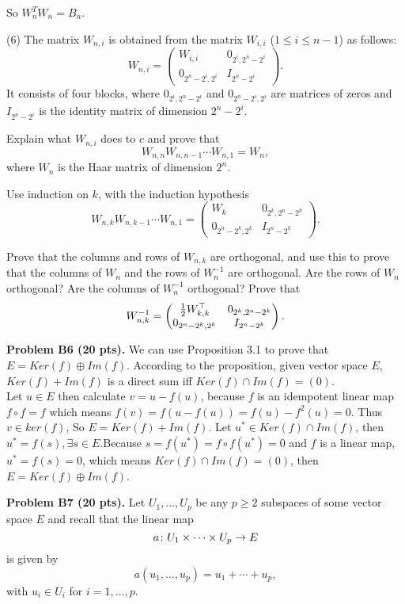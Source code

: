 \documentclass[12pt]{article}
\begin{document}
So $W_n^TW_n = B_n$.




\medskip
(6)
The matrix $W_{n, i}$ is obtained from the matrix $W_{i, i}$ 
($1 \leq i \leq n - 1$) as follows:
\[
W_{n, i} = 
\begin{pmatrix}
 W_{i, i} & 0_{2^{i}, 2^{n} - 2^{i}} \\
0_{2^{n}- 2^{i}, 2^i} & I_{2^{n} - 2^{i}}
\end{pmatrix}.
\]
It consists of four blocks,
where  $0_{2^{i}, 2^{n} - 2^{i}}$ and $0_{2^{n} - 2^{i}, 2^i}$
are matrices of zeros and $I_{2^{n} - 2^{i}}$ is the identity matrix of
dimension $2^{n} - 2^i$.

\medskip
Explain what $W_{n, i}$ does to $c$ and prove that
\[
W_{n, n} W_{n, n - 1} \cdots W_{n, 1} = W_n,
\]
where $W_n$ is the Haar matrix of dimension $2^n$.

\medskip
\hint
Use induction on $k$,  with the induction hypothesis
\[
W_{n, k} W_{n, k - 1}\cdots W_{n, 1} = 
\begin{pmatrix}
 W_{k} & 0_{2^{k}, 2^{n} - 2^{k}} \\
0_{2^{n}- 2^{k}, 2^k} &  I_{2^{n} - 2^{k}}
\end{pmatrix}.
\]


\medskip
Prove that the columns and rows of $W_{n, k}$ are orthogonal, and use
this to prove that the columns of $W_n$ and the rows of
$W_n^{-1}$ are orthogonal. 
Are the rows of  $W_n$ orthogonal?
Are the columns of  $W_n^{-1}$ orthogonal?
Prove that
\[
W_{n, k}^{-1} = 
\begin{pmatrix}
 \frac{1}{2}W_{k, k}^{\top} & 0_{2^{k}, 2^{n} - 2^{k}} \\
0_{2^{n}- 2^{k}, 2^k} &  I_{2^{n} - 2^{k}}
\end{pmatrix}.
\]


\vspace {0.25cm}\noindent
{\bf Problem B6 (20 pts).}
We can use Proposition 3.1 to prove that $E=Ker(f)\oplus Im(f)$.
According to the proposition, given vector space $E$, $Ker(f)+Im(f)$
is a direct sum iff $Ker(f)\cap Im(f)=(0)$. \\
Let $u \in E$ then calculate $v = u - f(u)$, because $f$ is an idempotent linear map $f \circ f = f$ which means $f(v) = f(u - f(u)) = f(u) - f^2(u) = 0$. Thus $v \in ker(f)$, So $E = Ker(f) + Im(f)$. Let $u^* \in Ker(f) \cap Im(f)$, then $u^* = f(s), \exists s \in E$.Because $s = f(u^*) = f \circ f(u^*) = 0$ and $f$ is a linear map, $u^* = f(s) = 0$, which means $Ker(f) \cap Im(f)=(0)$, then $E = Ker(f) \oplus Im(f)$.

\medskip
\vspace {0.25cm}\noindent
{\bf Problem B7 (20 pts).}
Let $U_1, \ldots, U_p$ be any  $p \geq 2$  subspaces of some vector
space $E$ and recall that the linear map
\[
a\colon U_1\times \cdots \times U_p\rightarrow E
\]
is given by
\[
a(u_1, \ldots, u_p) = u_1 + \cdots + u_p,
\]
with $u_i \in U_i$ for $i = 1, \ldots, p$.
\end{document}
